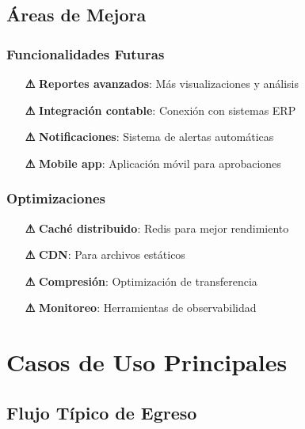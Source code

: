 \documentclass[12pt,a4paper]{article}
\newcommand{\warning}[1]{\textcolor{warningorange}{\textbf{#1}}}
\begin{document}
\subsection{Áreas de Mejora}

\subsubsection{Funcionalidades Futuras}
\begin{itemize}[leftmargin=*]
    \item[\warning{⚠}] \textbf{Reportes avanzados}: Más visualizaciones y análisis
    \item[\warning{⚠}] \textbf{Integración contable}: Conexión con sistemas ERP
    \item[\warning{⚠}] \textbf{Notificaciones}: Sistema de alertas automáticas
    \item[\warning{⚠}] \textbf{Mobile app}: Aplicación móvil para aprobaciones
\end{itemize}

\subsubsection{Optimizaciones}
\begin{itemize}[leftmargin=*]
    \item[\warning{⚠}] \textbf{Caché distribuido}: Redis para mejor rendimiento
    \item[\warning{⚠}] \textbf{CDN}: Para archivos estáticos
    \item[\warning{⚠}] \textbf{Compresión}: Optimización de transferencia
    \item[\warning{⚠}] \textbf{Monitoreo}: Herramientas de observabilidad
\end{itemize}


\section{Casos de Uso Principales}

\subsection{Flujo Típico de Egreso}
\end{document}
